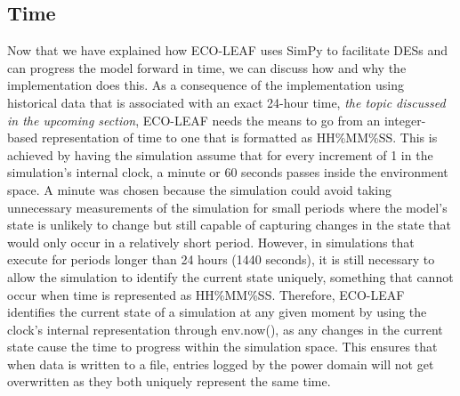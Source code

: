 \documentclass{l4proj}
\begin{document}
\subsection{Time}\label{imp:subsec:time}
Now that we have explained how ECO-LEAF uses SimPy to facilitate DESs and can progress the model forward in time, we can discuss how and why the implementation does this.
As a consequence of the implementation using historical data that is associated with an exact 24-hour time, \textit{the topic discussed in the upcoming section}, ECO-LEAF needs the means to go from an integer-based representation of time to one that is formatted as HH\%MM\%SS.
This is achieved by having the simulation assume that for every increment of 1 in the simulation's internal clock, a minute or 60 seconds passes inside the environment space.
A minute was chosen because the simulation could avoid taking unnecessary measurements of the simulation for small periods where the model's state is unlikely to change but still capable of capturing changes in the state that would only occur in a relatively short period.
However, in simulations that execute for periods longer than 24 hours (1440 seconds), it is still necessary to allow the simulation to identify the current state uniquely, something that cannot occur when time is represented as HH\%MM\%SS. Therefore, ECO-LEAF identifies the current state of a simulation at any given moment by using the clock's internal representation through env.now(), as any changes in the current state cause the time to progress within the simulation space.
This ensures that when data is written to a file, entries logged by the power domain will not get overwritten as they both uniquely represent the same time.
\end{document}
